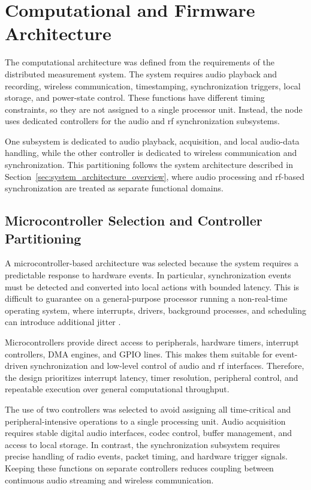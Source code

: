 \section{Computational and Firmware Architecture}

The computational architecture was defined from the requirements of the distributed measurement system. The system requires audio playback and recording, wireless communication, timestamping, synchronization triggers, local storage, and power-state control. These functions have different timing constraints, so they are not assigned to a single processor unit. Instead, the node uses dedicated  controllers for the audio and \acrshort{rf} synchronization subsystems.

One subsystem is dedicated to audio playback, acquisition, and local audio-data handling, while the other controller is dedicated to wireless communication and synchronization. This partitioning follows the system architecture described in Section~\ref{sec:system_architecture_overview}, where audio processing and \acrshort{rf}-based synchronization are treated as separate functional domains.


\subsection{Microcontroller Selection and Controller Partitioning}

A microcontroller-based architecture was selected because the system requires a predictable response to hardware events. In particular, synchronization events must be detected and converted into local actions with bounded latency. This is difficult to guarantee on a general-purpose processor running a non-real-time operating system, where interrupts, drivers, background processes, and scheduling can introduce additional jitter \cite{ALBERTOS2005203}.

Microcontrollers provide direct access to peripherals, hardware timers, interrupt controllers, DMA engines, and GPIO lines. This makes them suitable for event-driven synchronization and low-level control of audio and \acrshort{rf} interfaces. Therefore, the design prioritizes interrupt latency, timer resolution, peripheral control, and repeatable execution over general computational throughput.

The use of two controllers was selected to avoid assigning all time-critical and peripheral-intensive operations to a single processing unit. Audio acquisition requires stable digital audio interfaces, codec control, buffer management, and access to local storage. In contrast, the synchronization subsystem requires precise handling of radio events, packet timing, and hardware trigger signals. Keeping these functions on separate controllers reduces coupling between continuous audio streaming and wireless communication.

